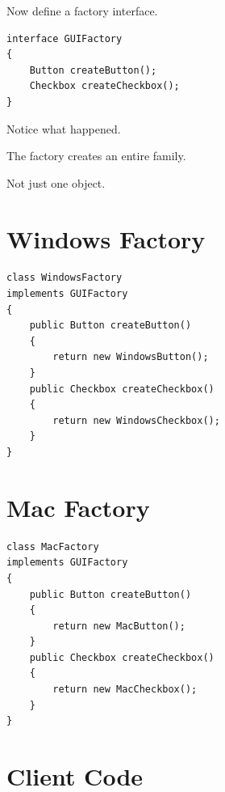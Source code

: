 \documentclass[11pt,a4paper]{book}
\begin{document}
Now define a factory interface.


\begin{verbatim}
interface GUIFactory
{
    Button createButton();
    Checkbox createCheckbox();
}
\end{verbatim}


Notice what happened.


The factory creates an entire
family.


Not just one object.


\section{Windows Factory}

\begin{verbatim}
class WindowsFactory
implements GUIFactory
{
    public Button createButton()
    {
        return new WindowsButton();
    }
    public Checkbox createCheckbox()
    {
        return new WindowsCheckbox();
    }
}
\end{verbatim}

\section{Mac Factory}

\begin{verbatim}
class MacFactory
implements GUIFactory
{
    public Button createButton()
    {
        return new MacButton();
    }
    public Checkbox createCheckbox()
    {
        return new MacCheckbox();
    }
}
\end{verbatim}

\section{Client Code}
\end{document}
